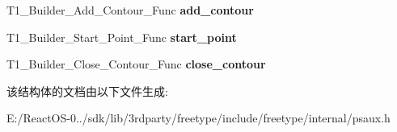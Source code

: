 \begin{DoxyCompactItemize}
T1\+\_\+\+Builder\+\_\+\+Add\+\_\+\+Contour\+\_\+\+Func {\bfseries add\+\_\+contour}
\item 
\mbox{\label{struct_t1___builder___funcs_rec___ab4897186c65875b4312d4ef68aad9d02}} 
T1\+\_\+\+Builder\+\_\+\+Start\+\_\+\+Point\+\_\+\+Func {\bfseries start\+\_\+point}
\item 
\mbox{\label{struct_t1___builder___funcs_rec___abe163896432cc768719bf87cef0d1266}} 
T1\+\_\+\+Builder\+\_\+\+Close\+\_\+\+Contour\+\_\+\+Func {\bfseries close\+\_\+contour}
\end{DoxyCompactItemize}


该结构体的文档由以下文件生成\+:\begin{DoxyCompactItemize}
\item 
E\+:/\+React\+O\+S-\/0../sdk/lib/3rdparty/freetype/include/freetype/internal/psaux.\+h\end{DoxyCompactItemize}
